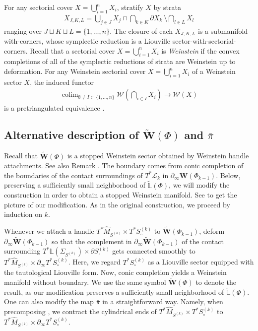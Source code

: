 \documentclass[a4paper,12pt, twoside, pdftex]{amsart}
\theoremstyle{definition}
\numberwithin{equation}{section}
\newcommand{\pref}{\prettyref}
\newcommand{\colim}{\operatorname{colim}}
\newcommand{\del}{\partial}
\newcommand{\cL}{\mathcal{L}}
\newcommand{\cW}{\mathcal{W}}
\newcommand{\bL}{\mathbb{L}}
\newcommand{\bfW}{\mathbf{W}}
\newcommand{\frakr}{\mathfrak{r}}
\begin{document}
For any sectorial cover
$X = \bigcup^n_{i =1} X_i$,
stratify
$X$
by strata
\begin{align} \label{eq:strata}
X_{J, K, L}
=
\bigcup_{j \in J} X_j
\cap
\bigcap_{k \in K} \del X_k \
\setminus
\bigcap_{l \in L} X_l
\end{align}
ranging over
$J \sqcup K \sqcup L = \{ 1, \ldots, n \}$.
The closure of each
$X_{J, K, L}$
is a submanifold-with-corners,
whose symplectic reduction is a Liouville sector-with-sectorial-corners.
Recall that
a sectorial cover
$X = \bigcup^n_{i =1} X_i$
is
\emph{Weinstein}
\cite[Definition 12.15]{GPS2}
if the convex completions of all of the symplectic reductions of strata
\pref{eq:strata}
are Weinstein up to deformation.
For any Weinstein sectorial cover
$X = \bigcup^n_{i = 1} X_i$
of a Weinstein sector
$X$,
the induced functor
\begin{align} \label{thm:hcolimit}
\displaystyle \colim_{\emptyset \neq I \subset \{ 1, \ldots, n \}} 
\cW(\bigcap_{i \in I} X_i)
\to
\cW (X)
\end{align}
is a pretriangulated equivalence
\cite[Theorem 1.35]{GPS2}.

\subsection{Alternative description of $\widetilde{\bfW}(\Phi)$ and $\bar{\pi}$}
Recall that
$\widetilde{\bfW}(\Phi)$
is a stopped Weinstein sector obtained by Weinstein handle attachments.
See also Remark
\pref{rmk:2.3}.
The boundary comes from conic completion of the boundaries of the contact surroundings of
$T^* \cL_k$
in
$\del_\infty{\bfW}(\Phi_{k-1})$.
Below,
preserving a sufficiently small neighborhood of
$\widetilde{\bL}(\Phi)$,
we will modify the construction in order to obtain a stopped Weinstein manifold.
See
\cite[Figure 3.1]{Eli}
to get the picture of our modification.
As in the original construction,
we proceed by induction on
$k$.

Whenever we attach a handle
$T^* \widehat{M}_{S^{(k)}} \times T^* S^{(k)}_\circ$ 
to
$\widetilde{\bfW}(\Phi_{k-1})$,
deform
$\del_\infty \widetilde{\bfW}(\Phi_{k-1})$ 
so that the complement in
$\del_\infty \widetilde{\bfW}(\Phi_{k-1})$
of the contact surrounding
$T^* \bL(\Sigma_{S^{(k)}}) \times \del S^{(k)}_\circ$
gets connected smoothly to
$T^* \widehat{M}_{S^{(k)}} \times \del_\infty T^* S^{(k)}_\circ$.
Here,
we regard
$T^* S^{(k)}_\circ$
as a Liouville sector equipped with the tautological Liouville form.
Now,
conic completion yields a Weinstein manifold without boundary.
We use the same symbol
$\widetilde{\bfW}(\Phi)$
to denote the result,
as our modification preserves a sufficiently small neighborhood of
$\widetilde{\bL}(\Phi)$.
One can also modify the map
$\bar{\pi}$
in a straightforward way.
Namely,
when precomposing
\pref{eq:cont},
we contract the cylindrical ends of
$T^* \widehat{M}_{S^{(k)}} \times T^* S^{(k)}_\circ$
to
$T^* \widehat{M}_{S^{(k)}} \times \del_\infty T^* S^{(k)}_\circ$.
\end{document}
